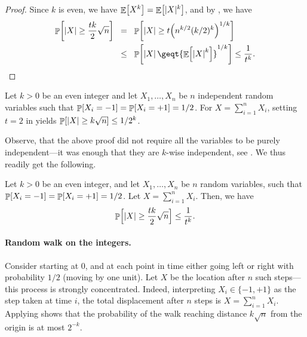 \begin{proof}
    Since $k$ is even, we have $\mathop{\mathbb{E}}\!\left[ {X^k} \right] = \mathop{\mathbb{E}}\!\left[ {|X|^k} \right]$, and by
    , we have
    \begin{align*}
        \Prob{\cardin{X} \geq \frac{tk}{2} \sqrt{n}}%
        &\EQ%
        \Prob{\cardin{X} \geq t \pth{n^{k/2} (k/2)^k}^{1/k}}
        \\&
        \LEQ%
        \Prob{ \cardin{X} \geq%
           t {\Ex{ \bigl. {\cardin{X}}^k} }^{1/k}} \leq \frac{1}{t^k}.
    \end{align*}
\end{proof}


\begin{corollary}
    Let $k > 0$ be an even integer and let $X_1, \ldots, X_n$ be $n$
    independent random variables such that
    $\Prob{X_i=-1} = \Prob{X_i =+1} = 1/2$. For
    $X = \sum_{i=1}^n X_i$, setting $t=2$ in  yields
    $\Prob{|X| \geq k \sqrt{n}} \leq 1/2^k$.
\end{corollary}

Observe, that the above proof did not require all the variables to be
purely independent---it was enough that they are $k$-wise independent, see
.  We thus readily get the following.


\begin{lemma}
    Let $k > 0 $ be an even integer, and let $X_1, \ldots, X_n$ be $n$
     random variables,
    such that $\Prob{X_i=-1} = \Prob{X_i =+1} = 1/2$. Let
    $X = \sum_{i=1}^n X_i$. Then, we have
    \begin{align*}
      \Prob{\smash{\cardin{X} \geq \frac{tk}{2} \sqrt{n}}\Bigr.}%
      \leq%
      \frac{1}{t^k}.
    \end{align*}
\end{lemma}



\paragraph*{Random walk on the integers.}

Consider starting at $0$, and at each point in time either going left or
right with probability $1/2$ (moving by one unit). Let $X$ be the
location after $n$ such steps---this process is strongly concentrated.
Indeed, interpreting $X_i \in \{-1, +1\}$ as the step taken at time $i$,
the total displacement after $n$ steps is $X = \sum_{i=1}^n X_i$. Applying
 shows that the probability of the walk
reaching distance $k\sqrt{n}$ from the origin is at most $2^{-k}$.

